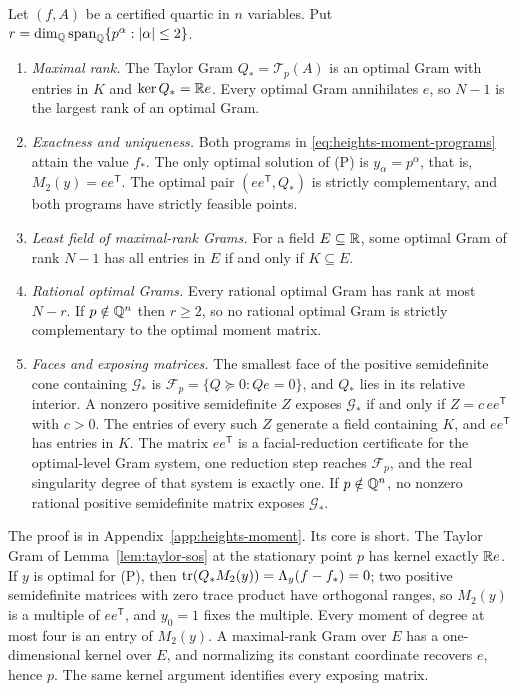 \begin{theorem}
\label{thm:heights-moment}
Let $(f,A)$ be a certified quartic in $n$ variables. Put
$r=\dim_\mathbb Q\operatorname{span}_\mathbb Q\{p^\alpha:|\alpha|\le2\}$.
\begin{enumerate}[label=(\alph*)]
\item \emph{Maximal rank.} The Taylor Gram $Q_*=\mathcal T_p(A)$ is an optimal
  Gram with entries in $K$ and $\ker Q_*=\mathbb R e$. Every optimal Gram annihilates
  $e$, so $N-1$ is the largest rank of an optimal Gram.
\item \emph{Exactness and uniqueness.} Both programs in
  \eqref{eq:heights-moment-programs} attain the value $f_*$. The only optimal
  solution of (P) is $y_\alpha=p^\alpha$, that is, $M_2(y)=ee^{\mathsf T}$.
  The optimal pair $(ee^{\mathsf T},Q_*)$ is strictly complementary, and both
  programs have strictly feasible points.
\item \emph{Least field of maximal-rank Grams.} For a field
  $E\subseteq\mathbb R$, some optimal Gram of rank $N-1$ has all entries in $E$ if
  and only if $K\subseteq E$.
\item \emph{Rational optimal Grams.} Every rational optimal Gram has rank at
  most $N-r$. If $p\notin\mathbb Q^n$ then $r\ge2$, so no rational optimal Gram is
  strictly complementary to the optimal moment matrix.
\item \emph{Faces and exposing matrices.} The smallest face of the positive
  semidefinite cone containing $\mathcal G_*$ is
  $\mathcal F_p=\{Q\succeq0:Qe=0\}$, and $Q_*$ lies in its relative interior.
  A nonzero positive semidefinite $Z$ exposes $\mathcal G_*$ if and only if
  $Z=c\,ee^{\mathsf T}$ with $c>0$. The entries of every such $Z$ generate a
  field containing $K$, and $ee^{\mathsf T}$ has entries in $K$. The matrix
  $ee^{\mathsf T}$ is a facial-reduction certificate for the optimal-level
  Gram system, one reduction step reaches $\mathcal F_p$, and the real
  singularity degree of that system is exactly one. If $p\notin\mathbb Q^n$, no
  nonzero rational positive semidefinite matrix exposes $\mathcal G_*$.
\end{enumerate}
\end{theorem}

The proof is in Appendix~\ref{app:heights-moment}. Its core is short. The
Taylor Gram of Lemma~\ref{lem:taylor-sos} at the stationary point $p$ has
kernel exactly $\mathbb R e$. If $y$ is optimal for (P), then
$\operatorname{tr}(Q_*M_2(y))=\Lambda_y(f-f_*)=0$; two positive semidefinite matrices with
zero trace product have orthogonal ranges, so $M_2(y)$ is a multiple of
$ee^{\mathsf T}$, and $y_0=1$ fixes the multiple. Every moment of degree at
most four is an entry of $M_2(y)$. A maximal-rank Gram over $E$ has a
one-dimensional kernel over $E$, and normalizing its constant coordinate
recovers $e$, hence $p$. The same kernel argument identifies every exposing
matrix.

